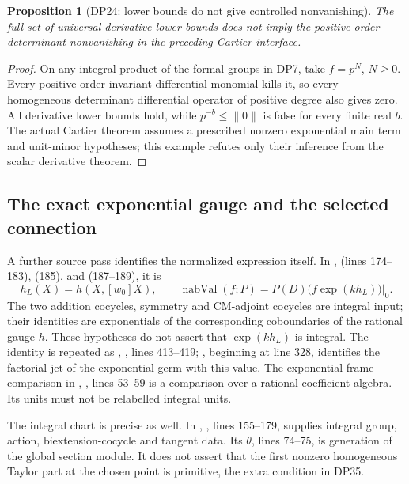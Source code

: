\documentclass[11pt,a4paper]{article}
\newtheorem{proposition}[theorem]{Proposition}
\theoremstyle{definition}\newtheorem{remark}[theorem]{Remark}
\begin{document}
\begin{proposition}[DP24: lower bounds do not give controlled nonvanishing]\label{DP24}
The full set of universal derivative lower bounds does not imply the positive-order determinant nonvanishing in the preceding Cartier interface.
\end{proposition}
\begin{proof}
On any integral product of the formal groups in DP7, take $f=p^N$, $N\ge0$. Every positive-order invariant differential monomial kills it, so every homogeneous determinant differential operator of positive degree also gives zero. All derivative lower bounds hold, while $p^{-b}\le\lVert0\rVert$ is false for every finite real $b$. The actual Cartier theorem assumes a prescribed nonzero exponential main term and unit-minor hypotheses; this example refutes only their inference from the scalar derivative theorem.
\end{proof}

\subsection{The exact exponential gauge and the selected connection}\label{sec:connection}

A further source pass identifies the normalized expression itself. In
,
 (lines 174--183),  (185), and  (187--189), it is
\[
 h_L(X)=h(X,[w_0]X),\qquad
 \operatorname{nabVal}(f;P)=\left.P(D)\bigl(f\exp(kh_L)\bigr)\right|_0.
\]
The two addition cocycles, symmetry and CM-adjoint cocycles are integral input; their identities are exponentials of the corresponding coboundaries of the rational gauge $h$. These hypotheses do not assert that $\exp(kh_L)$ is integral. The identity is repeated as , , lines 413--419; , beginning at line 328, identifies the factorial jet of the exponential germ with this value. The exponential-frame comparison in , , lines 53--59 is a comparison over a rational coefficient algebra. Its units must not be relabelled integral units.

The integral chart is precise as well. In , , lines 155--179, supplies integral group, action, biextension-cocycle and tangent data. Its \ensuremath{\theta}, lines 74--75, is generation of the global section module. It does not assert that the first nonzero homogeneous Taylor part at the chosen point is primitive, the extra condition in DP35.
\end{document}
